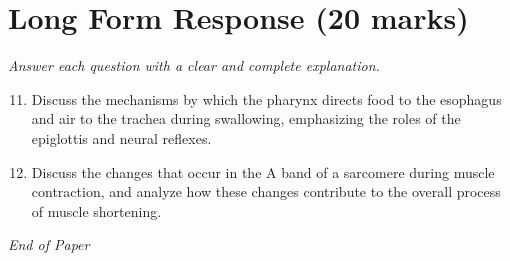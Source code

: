 \documentclass[12pt]{article}
\begin{document}
\section*{Long Form Response (20 marks)}
\textit{Answer each question with a clear and complete explanation.}
\begin{enumerate}[label=\arabic*.]
\setcounter{enumi}{10}
\item Discuss the mechanisms by which the pharynx directs food to the esophagus and air to the
trachea during swallowing, emphasizing the roles of the epiglottis and neural reflexes.
\item Discuss the changes that occur in the A band of a sarcomere during muscle contraction, and
analyze how these changes contribute to the overall process of muscle shortening.
\end{enumerate}

\vfill
\noindent\textit{End of Paper}
\end{document}
